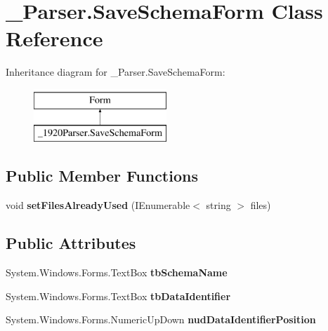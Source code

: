 \hypertarget{class__1920_parser_1_1_save_schema_form}{}\section{\+\_\+Parser.\+Save\+Schema\+Form Class Reference}
\label{class__1920_parser_1_1_save_schema_form}
Inheritance diagram for \+\_\+Parser.\+Save\+Schema\+Form\+:\begin{figure}[H]
\begin{center}
\leavevmode
\includegraphics[height=2.000000cm]{class__1920_parser_1_1_save_schema_form}
\end{center}
\end{figure}
\subsection*{Public Member Functions}
\begin{DoxyCompactItemize}
\item 
void {\bfseries set\+Files\+Already\+Used} (I\+Enumerable$<$ string $>$ files)\hypertarget{class__1920_parser_1_1_save_schema_form_a16d5555788d91934ca0e62f9e45fd21d}{}\label{class__1920_parser_1_1_save_schema_form_a16d5555788d91934ca0e62f9e45fd21d}

\end{DoxyCompactItemize}
\subsection*{Public Attributes}
\begin{DoxyCompactItemize}
\item 
System.\+Windows.\+Forms.\+Text\+Box {\bfseries tb\+Schema\+Name}\hypertarget{class__1920_parser_1_1_save_schema_form_ae4760769155fc202f53ea12b63d14633}{}\label{class__1920_parser_1_1_save_schema_form_ae4760769155fc202f53ea12b63d14633}

\item 
System.\+Windows.\+Forms.\+Text\+Box {\bfseries tb\+Data\+Identifier}\hypertarget{class__1920_parser_1_1_save_schema_form_a6b4727fdf859c257a72b637ffae15bdc}{}\label{class__1920_parser_1_1_save_schema_form_a6b4727fdf859c257a72b637ffae15bdc}

\item 
System.\+Windows.\+Forms.\+Numeric\+Up\+Down {\bfseries nud\+Data\+Identifier\+Position}\hypertarget{class__1920_parser_1_1_save_schema_form_afb1dbb18d04daa7d93d504ebf2b28dae}{}\label{class__1920_parser_1_1_save_schema_form_afb1dbb18d04daa7d93d504ebf2b28dae}

\end{DoxyCompactItemize}
